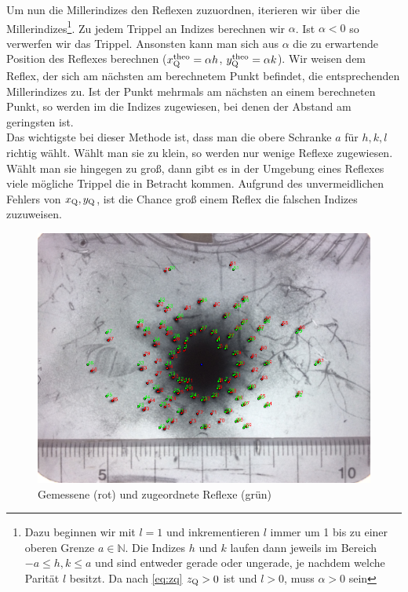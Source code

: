 Um nun die Millerindizes den Reflexen zuzuordnen, iterieren wir über die Millerindizes\footnote{Dazu beginnen wir mit $l=1$ und inkrementieren $l$ immer um 1 bis zu einer oberen Grenze $a \in \mathbb{N}$. Die Indizes $h$ und $k$ laufen dann jeweils im Bereich $-a \leq h,k \leq a$ und sind entweder gerade oder ungerade, je nachdem welche Parität $l$ besitzt. Da nach \ref{eq:zq} $z_\mathrm{Q} > 0$ ist und $l > 0$, muss $\alpha > 0$ sein}. Zu jedem Trippel an Indizes berechnen wir $\alpha$. Ist $\alpha < 0$ so verwerfen wir das Trippel. Ansonsten kann man sich aus $\alpha$ die zu erwartende Position des Reflexes berechnen ($x_\mathrm{Q}^\mathrm{theo} = \alpha h$, $y_\mathrm{Q}^\mathrm{theo} = \alpha k$). Wir weisen dem Reflex, der sich am nächsten am berechnetem Punkt befindet, die entsprechenden Millerindizes zu. Ist der Punkt mehrmals am nächsten an einem berechneten Punkt, so werden im die Indizes zugewiesen, bei denen der Abstand am geringsten ist.\\

Das wichtigste bei dieser Methode ist, dass man die obere Schranke $a$ für $h,k,l$ richtig wählt. Wählt man sie zu klein, so werden nur wenige Reflexe zugewiesen. Wählt man sie hingegen zu groß, dann gibt es in der Umgebung eines Reflexes viele mögliche Trippel die in Betracht kommen. Aufgrund des unvermeidlichen Fehlers von $x_\mathrm{Q}, y_\mathrm{Q}$, ist die Chance groß einem Reflex die falschen Indizes zuzuweisen.\\

\begin{figure}
\centering
\includegraphics[scale=0.6]{data/laue/draw/laue.png}
\caption{Gemessene (rot) und zugeordnete Reflexe (grün)}
\label{fig:laue_calc}
\end{figure}

